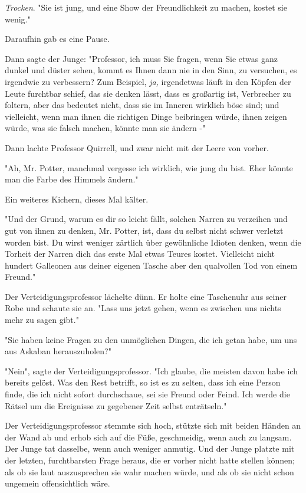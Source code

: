 {\emph{Trocken}. "Sie ist jung, und eine Show der Freundlichkeit zu machen, kostet sie wenig."

Daraufhin gab es eine Pause.

Dann sagte der Junge: "Professor, ich muss Sie fragen, wenn Sie etwas ganz dunkel und düster sehen, kommt es Ihnen dann nie in den Sinn, zu versuchen, es irgendwie zu verbessern? Zum Beispiel, \emph{ja,} irgendetwas läuft in den Köpfen der Leute furchtbar schief, das sie denken lässt, dass es großartig ist, Verbrecher zu foltern, aber das bedeutet nicht, dass sie im Inneren wirklich böse sind; und vielleicht, wenn man ihnen die richtigen Dinge beibringen würde, ihnen zeigen würde, was sie falsch machen, könnte man sie ändern -"

Dann lachte Professor Quirrell, und zwar nicht mit der Leere von vorher.

"Ah, Mr. Potter, manchmal vergesse ich wirklich, wie jung du bist. Eher könnte man die Farbe des Himmels ändern."

Ein weiteres Kichern, dieses Mal kälter.

"Und der Grund, warum es dir so leicht fällt, solchen Narren zu verzeihen und gut von ihnen zu denken, Mr. Potter, ist, dass du selbst nicht schwer verletzt worden bist. Du wirst weniger zärtlich über gewöhnliche Idioten denken, wenn die Torheit der Narren dich das erste Mal etwas Teures kostet. Vielleicht nicht hundert Galleonen aus deiner eigenen Tasche aber den qualvollen Tod von einem Freund."

Der Verteidigungsprofessor lächelte dünn. Er holte eine Taschenuhr aus seiner Robe und schaute sie an. "Lass uns jetzt gehen, wenn es zwischen uns nichts mehr zu sagen gibt."

"Sie haben keine Fragen zu den unmöglichen Dingen, die ich getan habe, um uns aus Askaban herauszuholen?"

"Nein", sagte der Verteidigungsprofessor. "Ich glaube, die meisten davon habe ich bereits gelöst. Was den Rest betrifft, so ist es zu selten, dass ich eine Person finde, die ich nicht sofort durchschaue, sei sie Freund oder Feind. Ich werde die Rätsel um die Ereignisse zu gegebener Zeit selbst enträtseln."

Der Verteidigungsprofessor stemmte sich hoch, stützte sich mit beiden Händen an der Wand ab und erhob sich auf die Füße, geschmeidig, wenn auch zu langsam. Der Junge tat dasselbe, wenn auch weniger anmutig. Und der Junge platzte mit der letzten, furchtbarsten Frage heraus, die er vorher nicht hatte stellen können; als ob sie laut auszusprechen sie wahr machen würde, und als ob sie nicht schon ungemein offensichtlich wäre.

}

